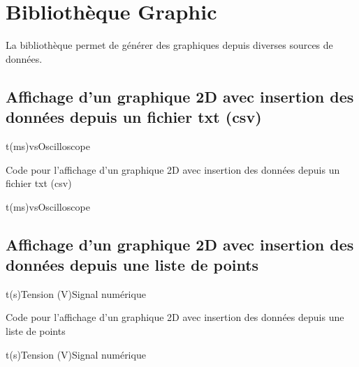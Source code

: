 \chapter{Bibliothèque Graphic}

La bibliothèque  permet de générer des graphiques depuis diverses sources de données.

\section{Affichage d'un graphique 2D avec insertion des données depuis un fichier txt (csv)}

\begin{graphic}{0.8}{0.6}{0}{2.1}{-1.1}{1.1}{t(ms)}{vs}{Oscilloscope}
\end{graphic}

\begin{Latex}{Code pour l'affichage d'un graphique 2D avec insertion des données depuis un fichier txt (csv)}
\begin{graphic}{0.8}{0.6}{0}{2.1}{-1.1}{1.1}{t(ms)}{vs}{Oscilloscope}
\end{graphic}
\end{Latex}



\section{Affichage d'un graphique 2D avec insertion des données depuis une liste de points}

\begin{graphic}{0.8}{0.4}{0}{40}{-1}{6}{t(s)}{Tension (V)}{Signal numérique}
\end{graphic}

\begin{Latex}{Code pour l'affichage d'un graphique 2D avec insertion des données depuis une liste de points}
\begin{graphic}{0.8}{0.4}{0}{40}{-1}{6}{t(s)}{Tension (V)}{Signal numérique}
\end{graphic}
\end{Latex}


